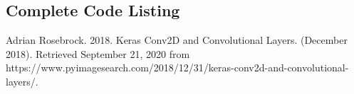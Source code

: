 \documentclass{article}
\begin{document}
\begin{appendices}
\newpage
\section{Complete Code Listing} \label{codelist}

\end{appendices}

\begin{thebibliography}{9}
  Adrian Rosebrock. 2018. Keras Conv2D and Convolutional Layers. (December 2018). Retrieved September 21, 2020 from https://www.pyimagesearch.com/2018/12/31/keras-conv2d-and-convolutional-layers/.
  
  \end{thebibliography}
\end{document}
